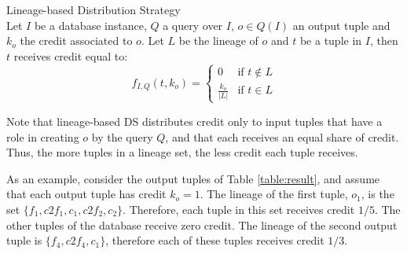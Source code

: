 \begin{definition}{Lineage-based Distribution Strategy}~\citep{dosso2020data}
    \label{def:lineage_ds}\\
    Let $I$ be a database instance, $Q$ a query over $I$, $o \in Q(I)$ an output tuple and $k_o$ the credit associated to $o$.
    Let $L$ be the lineage of $o$ and $t$ be a tuple in $I$, then $t$ receives credit equal to:
    \begin{equation*}
        f_{I, Q}(t, k_o) =  \begin{cases}
         0 & \mbox{if $t \notin L$} \\
            \frac{k_o}{|L|} & \mbox{if $t \in L$}
        \end{cases}
    \end{equation*}
\end{definition}

%

Note that lineage-based DS distributes credit only to input tuples that have a role in creating $o$ by the query $Q$, and that each receives an equal share of credit. Thus, the more tuples in a lineage set, the less credit each tuple receives. 


As an example, consider the output tuples of Table \ref{table:result}, and assume that each output tuple has credit $k_o = 1$.
The lineage of the first tuple, $o_1$, is the set $\{f_1, c2f_1, c_1, c2f_2, c_2\}$. Therefore, each tuple in this set receives credit $1/5$. The other tuples of the database receive zero credit.
The lineage of the second output tuple is $\{ f_4, c2f_4, c_1\}$, therefore each of these tuples receives credit $1/3$.

